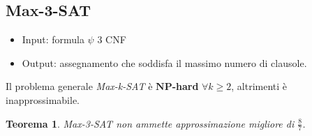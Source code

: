 \documentclass[a4paper]{article}
\newtheorem{thm}{Teorema}[subsection]
\theoremstyle{definition}
\newcommand{\np}{\mathbf{NP}}
\begin{document}
		
		\subsection{Max-3-SAT}
		\begin{itemize}
			\item Input: formula $\psi$ 3 CNF
			\item Output: assegnamento che soddisfa il massimo numero di clausole.
		\end{itemize}
	
	\noindent
	Il problema generale \textit{Max-k-SAT} è $\np$\textbf{-hard} $\forall k \geq 2$, altrimenti è inapprossimabile.\\
	\begin{thm}
		\textit{Max-3-SAT} non ammette approssimazione migliore di $\frac{8}{7}$.
	\end{thm}
\end{document}
